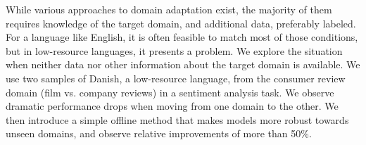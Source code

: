 While various approaches to domain adaptation exist, the majority of them requires knowledge of the target domain, and additional data, preferably labeled. For a language like English, it is often feasible to match most of those conditions, but in low-resource languages, it presents a problem. We explore the situation when neither data nor other information about the target domain is available. We use two samples of Danish, a low-resource language, from the consumer review domain (film vs. company reviews) in a sentiment analysis task. We observe dramatic performance drops when moving from one domain to the other. We then introduce a simple offline method that makes models more robust towards unseen domains, and observe relative improvements of more than 50\%.
